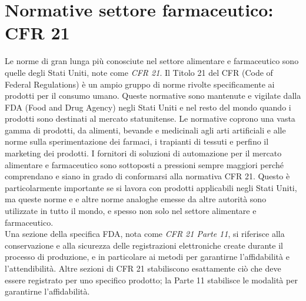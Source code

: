\documentclass[12pt, a4paper, oneside]{book}
\begin{document}
\section{Normative settore farmaceutico: CFR 21}
Le norme di gran lunga più conosciute nel settore alimentare e farmaceutico sono quelle degli Stati Uniti, note come \textit{CFR 21}. Il Titolo 21 del CFR (Code of Federal Regulations) è un ampio gruppo di norme rivolte specificamente ai prodotti per il consumo umano. Queste normative sono mantenute e vigilate dalla FDA (Food and Drug Agency) negli Stati Uniti e nel resto del mondo quando i prodotti sono destinati al mercato statunitense. Le normative coprono una vasta gamma di prodotti, da alimenti, bevande e medicinali agli arti artificiali e alle norme sulla sperimentazione dei farmaci, i trapianti di tessuti e perfino il marketing dei prodotti. I fornitori di soluzioni di automazione per il mercato alimentare e farmaceutico sono sottoposti a pressioni sempre maggiori perché comprendano e siano in grado di conformarsi alla normativa CFR 21. Questo è particolarmente importante se si lavora con prodotti applicabili negli Stati Uniti, ma queste norme e e altre norme analoghe emesse da altre autorità sono utilizzate in tutto il mondo, e spesso non solo nel settore alimentare e farmaceutico.
\\Una sezione della specifica FDA, nota come \textit{CFR 21 Parte 11}, si riferisce alla conservazione e alla sicurezza delle registrazioni elettroniche create durante il processo di produzione, e in particolare ai metodi per garantirne l'affidabilità e l'attendibilità. Altre sezioni di CFR 21 stabiliscono esattamente ciò che deve essere registrato per uno specifico prodotto; la Parte 11 stabilisce le modalità per garantirne l'affidabilità. 
\end{document}
